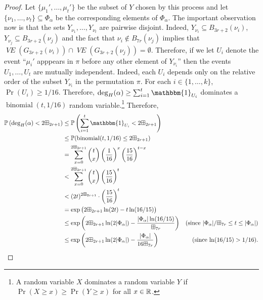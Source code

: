 \documentclass{patmorin}
\newcommand{\vol}[1]{\boxplus_{#1}}
\DeclareMathOperator{\binomial}{binomial}
\DeclareMathOperator{\VE}{\mathit{VE}}
\begin{document}
\begin{proof}
  Let $\{\mu_1',\ldots,\mu_t'\}$ be the subset of $Y$ chosen by this process and let $\{\nu_1,\ldots,\nu_t\}\subseteq\Phi_\alpha$ be the corresponding elements of $\Phi_\alpha$.  The important observation now is that the sets $Y_{\nu_1},\ldots,Y_{\nu_t}$ are pairwise disjoint.  Indeed, $Y_{\nu_i}\subseteq B_{3r+2}(\nu_i)$, $Y_{\nu_j}\subseteq B_{3r+2}(\nu_j)$ and the fact that $\nu_i\not\in B_{7r}(\nu_j)$ implies that $\VE(G_{3r+2}(\nu_i))\cap \VE(G_{3r+2}(\nu_j))=\emptyset$.  Therefore, if we let $U_i$ denote the event ``$\mu_i'$ apppears in $\pi$ before any other element of $Y_{\nu_i}$'' then the events $U_1,\ldots,U_t$ are mutually independent.  Indeed, each $U_i$ depends only on the relative order of the subset $Y_{\nu_i}$ in the permutation $\pi$.  For each $i\in\{1,\ldots,k\}$, $\Pr(U_i)\ge 1/16$.  Therefore, $\deg_H(\alpha)\ge \sum_{i=1}^t \mathbbm{1}_{U_i}$ dominates a $\binomial(t,1/16)$ random variable.\footnote{A random variable $X$ dominates a random variable $Y$ if $\Pr(X\ge x)\ge \Pr(Y\ge x)$ for all $x\in\mathbb{R}$.}  Therefore,
  \begin{align}
    \Pr\left(\deg_H(\alpha)< 2\vol{2r+1}\right)
    & \le \Pr\left(\sum_{i=1}^t \mathbbm{1}_{U_i} < 2\vol{2r+1}\right) \notag \\
    & \le \Pr(\binomial(t,1/16)\le 2\vol{2r+1}) \notag \\
    & = \sum_{x=0}^{2\vol{2r+1}} \binom{t}{x}\left(\frac{1}{16}\right)^x\left(\frac{15}{16}\right)^{t-x} \notag \\
    & < \sum_{x=0}^{2\vol{2r+1}} \binom{t}{x}\left(\frac{15}{16}\right)^{t} \notag \\
    & < (2t)^{2\vol{2r+1}}\cdot\left(\frac{15}{16}\right)^{t} \notag \\
    & = \exp\big({2\vol{2r+1}}\ln(2t)-t\ln(16/15)\big) \notag \\
    & \le \exp\left({2\vol{2r+1}}\ln(2|\Phi_\alpha|)-\frac{|\Phi_\alpha|\ln(16/15)}{\vol{7r}}\right)
      & \text{(since $|\Phi_\alpha|/\vol{7r} \le t \le |\Phi_\alpha|$)} \notag \\
    & \le \exp\left({2\vol{2r+1}}\ln(2|\Phi_\alpha|)-\frac{|\Phi_\alpha|}{16\vol{7r}}\right)
      & \text{(since $\ln(16/15) > 1/16$).}
       \label{probability}
  \end{align}



\end{proof}
\end{document}
